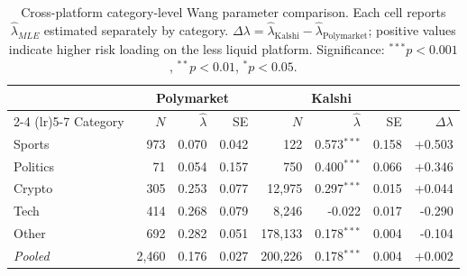 \begin{table}[H]
\centering
\small
\caption{Cross-platform category-level Wang parameter comparison. Each cell reports $\hat{\lambda}_{MLE}$ estimated separately by category. $\Delta\lambda = \hat{\lambda}_{\text{Kalshi}} - \hat{\lambda}_{\text{Polymarket}}$; positive values indicate higher risk loading on the less liquid platform. Significance: $^{***}p<0.001$, $^{**}p<0.01$, $^{*}p<0.05$.}
\label{tab:cross_platform_category}
\begin{tabular}{lrrrrrrr}
\toprule
 & \multicolumn{3}{c}{Polymarket} & \multicolumn{3}{c}{Kalshi} & \\
\cmidrule(lr){2-4} \cmidrule(lr){5-7}
Category & $N$ & $\hat{\lambda}$ & SE & $N$ & $\hat{\lambda}$ & SE & $\Delta\lambda$ \\
\midrule
Sports & 973 & 0.070 & 0.042 & 122 & 0.573$^{***}$ & 0.158 & +0.503 \\
Politics & 71 & 0.054 & 0.157 & 750 & 0.400$^{***}$ & 0.066 & +0.346 \\
Crypto & 305 & 0.253 & 0.077 & 12,975 & 0.297$^{***}$ & 0.015 & +0.044 \\
Tech & 414 & 0.268 & 0.079 & 8,246 & -0.022 & 0.017 & -0.290 \\
Other & 692 & 0.282 & 0.051 & 178,133 & 0.178$^{***}$ & 0.004 & -0.104 \\
\midrule
\textit{Pooled} & 2,460 & 0.176 & 0.027 & 200,226 & 0.178$^{***}$ & 0.004 & +0.002 \\
\bottomrule
\end{tabular}
\end{table}